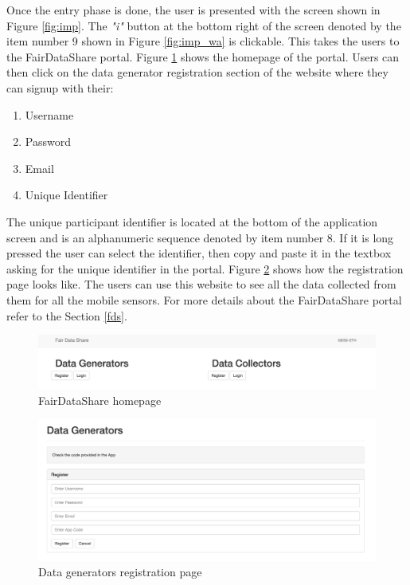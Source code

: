Once the entry phase is done, the user is presented with the screen shown in Figure \ref{fig:imp}.
The {\it "i"} button at the bottom right of the screen denoted by the item number 9 shown in Figure \ref{fig:imp_wa} is clickable. This takes the users to the FairDataShare portal. Figure \ref{fig:fds_home} shows the homepage of the portal. Users can then click on the data generator registration section of the website where they can signup with their:

\begin{enumerate}
    \item Username
    \item Password
    \item Email
    \item Unique Identifier
\end{enumerate}

The unique participant identifier is located at the bottom of the application screen and is an alphanumeric sequence denoted by item number 8. If it is long pressed the user can select the identifier, then copy and paste it in the textbox asking for the unique identifier in the portal. Figure \ref{fig:first} shows how the registration page looks like.
The users can use this website to see all the data collected from them for all the mobile sensors. For more details about the FairDataShare portal
refer to the Section \ref{fds}.
%

\begin{figure}[ht!]
\centering
\includegraphics[width=\textwidth,keepaspectratio]{./images/fds1}
\caption{FairDataShare homepage}
\label{fig:fds_home}
\end{figure}

\begin{figure}[ht!]
\centering
\includegraphics[width=\textwidth,keepaspectratio]{./images/fds_user_register1}
\caption{Data generators registration page}
\label{fig:first}
\end{figure}

